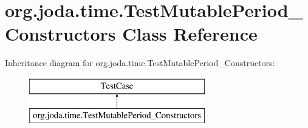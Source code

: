 \hypertarget{classorg_1_1joda_1_1time_1_1_test_mutable_period___constructors}{\section{org.\-joda.\-time.\-Test\-Mutable\-Period\-\_\-\-Constructors Class Reference}
\label{classorg_1_1joda_1_1time_1_1_test_mutable_period___constructors}
}
Inheritance diagram for org.\-joda.\-time.\-Test\-Mutable\-Period\-\_\-\-Constructors\-:\begin{figure}[H]
\begin{center}
\leavevmode
\includegraphics[height=2.000000cm]{classorg_1_1joda_1_1time_1_1_test_mutable_period___constructors}
\end{center}
\end{figure}
